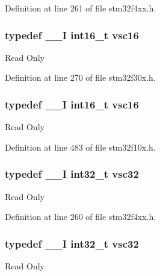 Definition at line 261 of file stm32f4xx.\-h.

\hypertarget{group___exported__types_ga369ae0177b957e5afa7c1e62312f97c3}{
\subsubsection[{vsc16}]{\setlength{\rightskip}{0pt plus 5cm}typedef \-\_\-\-\_\-\-I {\bf int16\-\_\-t} {\bf vsc16}}}\label{group___exported__types_ga369ae0177b957e5afa7c1e62312f97c3}
Read Only 

Definition at line 270 of file stm32f30x.\-h.

\hypertarget{group___exported__types_ga369ae0177b957e5afa7c1e62312f97c3}{
\subsubsection[{vsc16}]{\setlength{\rightskip}{0pt plus 5cm}typedef \-\_\-\-\_\-\-I {\bf int16\-\_\-t} {\bf vsc16}}}\label{group___exported__types_ga369ae0177b957e5afa7c1e62312f97c3}
Read Only 

Definition at line 483 of file stm32f10x.\-h.

\hypertarget{group___exported__types_gaec1d22666cf030b79051e5daa372fbc8}{
\subsubsection[{vsc32}]{\setlength{\rightskip}{0pt plus 5cm}typedef \-\_\-\-\_\-\-I {\bf int32\-\_\-t} {\bf vsc32}}}\label{group___exported__types_gaec1d22666cf030b79051e5daa372fbc8}
Read Only 

Definition at line 260 of file stm32f4xx.\-h.

\hypertarget{group___exported__types_gaec1d22666cf030b79051e5daa372fbc8}{
\subsubsection[{vsc32}]{\setlength{\rightskip}{0pt plus 5cm}typedef \-\_\-\-\_\-\-I {\bf int32\-\_\-t} {\bf vsc32}}}\label{group___exported__types_gaec1d22666cf030b79051e5daa372fbc8}
Read Only 

